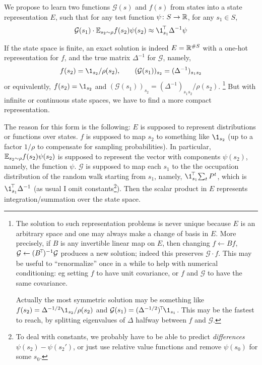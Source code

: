 \documentclass[11pt,a4paper]{article}
\newcommand{\green}{\mathcal{G}}
\begin{document}
We propose to learn two functions $\green(s)$ and $f(s)$ from states into
a state representation $E$, such that for any test function $\psi\colon
S\to {\mathbb{R}}$, for any $s_1\in S$,
\begin{equation}
\label{eq:greenrep}
\green(s_1)\cdot \E_{s_2\sim \rho}
f(s_2)\psi(s_2)\approx \transp{\1_{s_1}}\,\Delta^{-1} \psi
\end{equation}

If the state space is finite, an exact
solution is indeed $E={\mathbb{R}}^{\#S}$ with a one-hot representation for $f$,
and the true matrix $\Delta^{-1}$ for $\green$, namely,
\begin{equation}
f(s_2)=\1_{s_2}/\rho(s_2),\qquad
(\green(s_1))_{s_2}=(\Delta^{-1})_{s_1s_2}
\end{equation}
or equivalently, $f(s_2)=\1_{s_2}$ and
$(\green(s_1))_{s_2}=(\Delta^{-1})_{s_1s_2}/\rho(s_2)$. \footnote{The solution to
such representation problems is never unique because $E$ is an arbitrary
space and one may always make a change of basis in $E$. More precisely,
if $B$ is any invertible linear map on $E$, then changing $f\gets Bf$,
$\green\gets (\transp{B})^{-1}\green$ produces a new solution; indeed
this preserves $\green\cdot f$. This may
be useful to ``renormalize'' once in a while to help with numerical
conditioning: eg setting $f$ to have
unit covariance, or $f$ and $\green$ to have the same covariance.

Actually the most symmetric solution may be something like
$f(s_2)=\Delta^{-1/2}\1_{s_2}/\rho(s_2)$ and
$\green(s_1)=\transp{(\Delta^{-1/2})}\1_{s_1}$. This may be the fastest
to reach, by splitting eigenvalues of $\Delta$ halfway between $f$ and
$\green$.}
But with infinite or continuous state spaces, we have to find a more
compact representation.

The reason for this form is the following: $E$ is supposed to represent
distributions or functions over states. $f$ is supposed to map $s_2$ to
something like
$\1_{s_2}$ (up to a factor $1/\rho$ to compensate for sampling
probabilities). 
In
particular, $\mathbb{E}_{s_2\sim \rho}f(s_2)\psi(s_2)$ is supposed to represent
the vector with components $\psi(s_2)$, namely, the function $\psi$. $\green$ is supposed to map each
$s_1$ to the
the occupation
distribution of the random walk starting from $s_1$, namely,
$\transp{\1_{s_1}}\sum_t P^t$, which is $\transp{\1_{s_1}}\,\Delta^{-1}$
(as usual I
omit constants\footnote{To deal with constants, we probably have to be
able to predict \emph{differences} $\psi(s_2)-\psi(s_2')$, or just use
relative value functions and remove $\psi(s_0)$ for some $s_0$.}). Then the scalar product in
$E$ represents integration/summation over the state space.
\end{document}
